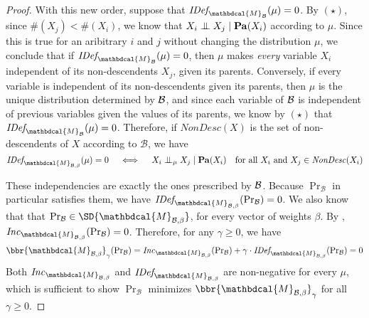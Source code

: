 \documentclass[letterpaper]{article} %
\theoremstyle{plain}
\theoremstyle{definition}
\theoremstyle{remark}
\let\H\relax
\DeclareMathOperator{\H}{\mathrm{H}} %
\newcommand{\CI}{\mathrel{\perp\mspace{-10mu}\perp}} %
\newcommand{\dg}[1]{\mathbdcal{#1}}
\newcommand\Pa{\mathbf{Pa}}
\newcommand{\IDef}[1]{\mathit{IDef}_{\!#1}}
\newcommand\Inc{\mathit{Inc}}
\newcommand{\PDGof}[1]{{\dg M}_{#1}}
\begin{document}
\begin{proof}
{	
	With this new order, suppose that 
	$\IDef{\PDGof{\cal B}}(\mu) = 0$.
	By $(\star)$, since $\#(X_j) < \#(X_i)$, we know that $X_i \CI X_j \mid \Pa(X_i)$ according to $\mu$. Since this is true for an aribitrary $i$ and $j$ without changing the distribution $\mu$, we conclude that if
	$\IDef{\PDGof{\cal B}}(\mu) = 0$, 
	then $\mu$ makes \emph{every} variable $X_i$ independent of its non-descendents $X_j$, given its parents.
	Conversely, if every variable is independent of its non-descendents given its parents, then $\mu$ is the unique distribution determined by $\cal B$, and since each variable of $\cal B$ is independent of previous variables given the values of its parents,  we know by $(\star)$ that
	$\IDef{\PDGof{\cal B}}(\mu) = 0$. 
	Therefore, if $\mathit{NonDesc}(X)$ is the set of non-descendents of $X$ according to $\mathcal B$, we have
\begin{equation}\label{eq:idef-bn-indeps}
 	\IDef{\PDGof{\mathcal B,\beta}}(\mu) = 0 \quad\iff\quad X_i \CI_\mu X_j \mid \Pa(X_i) \quad\text{for all $X_i$ and $X_j \in \mathit{NonDesc}(X_i)$} 
\end{equation}

These independencies are exactly the ones prescribed by $\cal B$.
Because $\Pr_{\mathcal B}$ in particular satisfies them,
we have $\IDef{\PDGof{\mathcal B,\beta}}(\Pr_{\cal B}) = 0$.
We also know that that $\Pr_{\cal B} \in \SD{\PDGof{\mathcal B,\beta}}$, for
every vector of weights $\beta$. By ,
$\Inc_{\PDGof{\mathcal B,\beta}}(\Pr_{\mathcal B}) = 0$. Therefore, for any
$\gamma \geq 0$, we have
\[ \bbr{\PDGof{\mathcal B, \beta}}_\gamma(\Pr\nolimits_{\cal B})
	= \Inc_{\PDGof{\mathcal B,\beta}}(\Pr\nolimits_{\mathcal B}) + \gamma \cdot
	\IDef{\PDGof{\mathcal B, \beta}}(\Pr\nolimits_{\cal B}) = 0
\]
Both $\Inc_{\PDGof{\mathcal B,\beta}}$ and $\IDef{\PDGof{\mathcal B, \beta}}$
are non-negative for every $\mu$, which is sufficient to show $\Pr_{\mathcal B}$
minimizes $\bbr{\PDGof{\mathcal B, \beta}}_\gamma$ for all $\gamma \geq 0$. 

}
\end{proof}
\end{document}
